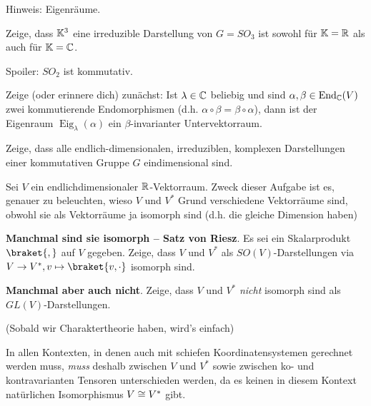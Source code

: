 \begin{sheet}
\begin{problem}[title={Kanonische Darstellung von $SO_2$}]
\begin{subproblem}
Hinweis: Eigenräume.
\end{subproblem}
\end{problem}

\begin{problem}[title={Die kanonische Darstellung von $SO_3$ ist irreduzibel}]\label{ex:fundamentaldarstellung_von_so3}
Zeige, dass $\mathbb{K}^3$ eine irreduzible Darstellung von $G=SO_3$ ist sowohl für $\mathbb{K}=\mathbb{R}$ als auch für $\mathbb{K}=\mathbb{C}$.
\end{problem}

\begin{problem}[title={Was geht bei $SO_2$ schief?}]
Spoiler: $SO_2$ ist kommutativ.

\begin{subproblem}
Zeige (oder erinnere dich) zunächst: Ist $\lambda\in\mathbb{C}$ beliebig und sind $\alpha,\beta\in\operatorname{End}_{\mathbb{C}}(V)$ zwei kommutierende Endomorphismen (d.h. $\alpha\circ\beta=\beta\circ\alpha$), dann ist der Eigenraum $\operatorname{Eig}_\lambda(\alpha)$ ein $\beta$-invarianter Untervektorraum.
\end{subproblem}
\begin{subproblem}
Zeige, dass alle endlich-dimensionalen, irreduziblen, komplexen Darstellungen einer kommutativen Gruppe $G$ eindimensional sind.
\end{subproblem}
\end{problem}

\begin{problem}[title={(Nicht-)Isomorphie von $V$ und $V^\ast$}]
Sei $V$ ein endlichdimensionaler $\mathbb{R}$-Vektorraum. Zweck dieser Aufgabe ist es, genauer zu beleuchten, wieso $V$ und $V^\ast$ Grund verschiedene Vektorräume sind, obwohl sie als Vektorräume ja isomorph sind (d.h. die gleiche Dimension haben)
\begin{subproblem}
\textbf{Manchmal sind sie isomorph -- Satz von Riesz}.
Es sei ein Skalarprodukt $\braket{,}$ auf $V$ gegeben. Zeige, dass $V$ und $V^\ast$ als $SO(V)$-Darstellungen via $V\to V^\ast, v\mapsto \braket{v,\cdot}$ isomorph sind.
\end{subproblem}
\begin{subproblem}[difficulty={schwerer als man denkt}]
\textbf{Manchmal aber auch nicht}.
Zeige, dass $V$ und $V^\ast$ \emph{nicht} isomorph sind als $GL(V)$-Darstellungen.

(Sobald wir Charaktertheorie haben, wird's einfach)
\end{subproblem}
\end{problem}

\begin{remark}
In allen Kontexten, in denen auch mit schiefen Koordinatensystemen gerechnet werden muss, \emph{muss} deshalb zwischen $V$ und $V^\ast$ sowie zwischen ko- und kontravarianten Tensoren unterschieden werden, da es keinen in diesem Kontext natürlichen Isomorphismus $V\cong V^\ast$ gibt.


\end{remark}
\end{sheet}
